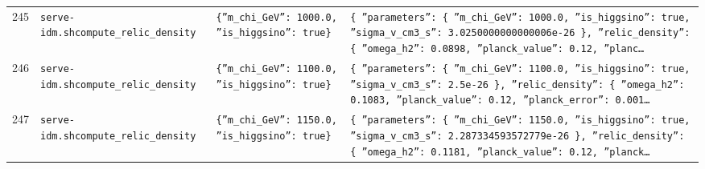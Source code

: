 \documentclass[11pt,a4paper]{article}
\begin{document}
\begin{longtable}{@{}p{}p{}p{}p{}@{}}
245 & \texttt{serve-idm.sh}\newline\texttt{compute\_\allowbreak{}relic\_\allowbreak{}density} & \texttt{\{''m\_\allowbreak{}chi\_\allowbreak{}GeV'':\allowbreak{} 1000.0,\allowbreak{} ''is\_\allowbreak{}higgsino'':\allowbreak{} true\}\allowbreak{}} & \texttt{\{   ''parameters'':\allowbreak{} \{     ''m\_\allowbreak{}chi\_\allowbreak{}GeV'':\allowbreak{} 1000.0,\allowbreak{}     ''is\_\allowbreak{}higgsino'':\allowbreak{} true,\allowbreak{}     ''sigma\_\allowbreak{}v\_\allowbreak{}cm3\_\allowbreak{}s'':\allowbreak{} 3.0250000000000006e-26   \}\allowbreak{},\allowbreak{}   ''relic\_\allowbreak{}density'':\allowbreak{} \{     ''omega\_\allowbreak{}h2'':\allowbreak{} 0.0898,\allowbreak{}     ''planck\_\allowbreak{}value'':\allowbreak{} 0.12,\allowbreak{}     ''planc\ldots{}\allowbreak{}} \\
246 & \texttt{serve-idm.sh}\newline\texttt{compute\_\allowbreak{}relic\_\allowbreak{}density} & \texttt{\{''m\_\allowbreak{}chi\_\allowbreak{}GeV'':\allowbreak{} 1100.0,\allowbreak{} ''is\_\allowbreak{}higgsino'':\allowbreak{} true\}\allowbreak{}} & \texttt{\{   ''parameters'':\allowbreak{} \{     ''m\_\allowbreak{}chi\_\allowbreak{}GeV'':\allowbreak{} 1100.0,\allowbreak{}     ''is\_\allowbreak{}higgsino'':\allowbreak{} true,\allowbreak{}     ''sigma\_\allowbreak{}v\_\allowbreak{}cm3\_\allowbreak{}s'':\allowbreak{} 2.5e-26   \}\allowbreak{},\allowbreak{}   ''relic\_\allowbreak{}density'':\allowbreak{} \{     ''omega\_\allowbreak{}h2'':\allowbreak{} 0.1083,\allowbreak{}     ''planck\_\allowbreak{}value'':\allowbreak{} 0.12,\allowbreak{}     ''planck\_\allowbreak{}error'':\allowbreak{} 0.001\ldots{}\allowbreak{}} \\
247 & \texttt{serve-idm.sh}\newline\texttt{compute\_\allowbreak{}relic\_\allowbreak{}density} & \texttt{\{''m\_\allowbreak{}chi\_\allowbreak{}GeV'':\allowbreak{} 1150.0,\allowbreak{} ''is\_\allowbreak{}higgsino'':\allowbreak{} true\}\allowbreak{}} & \texttt{\{   ''parameters'':\allowbreak{} \{     ''m\_\allowbreak{}chi\_\allowbreak{}GeV'':\allowbreak{} 1150.0,\allowbreak{}     ''is\_\allowbreak{}higgsino'':\allowbreak{} true,\allowbreak{}     ''sigma\_\allowbreak{}v\_\allowbreak{}cm3\_\allowbreak{}s'':\allowbreak{} 2.287334593572779e-26   \}\allowbreak{},\allowbreak{}   ''relic\_\allowbreak{}density'':\allowbreak{} \{     ''omega\_\allowbreak{}h2'':\allowbreak{} 0.1181,\allowbreak{}     ''planck\_\allowbreak{}value'':\allowbreak{} 0.12,\allowbreak{}     ''planck\ldots{}\allowbreak{}} \\

\end{longtable}
\end{document}
